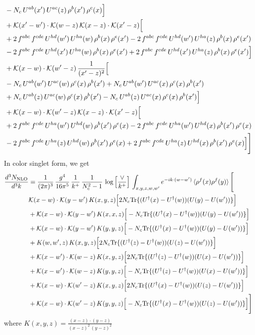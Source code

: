 \documentclass[9pt]{article}
\numberwithin{equation}{section}
\begin{document}
\begin{align}
& -N_{c}\,U^{ab}(x')\,U^{ac}(z)\,\rho^{b}(x')\,\rho^{c}(x)\Big]\notag\\
& +\mathcal{K}(x'-w')\cdot\mathcal{K}(w-z)\,\mathcal{K}(x-z)\cdot\mathcal{K}(x'-z)\Big[\notag\\
& +2\,f^{abc}\,f^{cde}\,U^{hd}(w')\,U^{ha}(w)\,\rho^{b}(x)\,\rho^{e}(x') -2\,f^{abc}\,f^{cde}\,U^{hd}(w')\,U^{ha}(z)\,\rho^{b}(x)\,\rho^{e}(x')\notag\\
& -2\,f^{abc}\,f^{cde}\,U^{hd}(x')\,U^{ha}(w)\,\rho^{b}(x)\,\rho^{e}(x') +2\,f^{abc}\,f^{cde}\,U^{hd}(x')\,U^{ha}(z)\,\rho^{b}(x)\,\rho^{e}(x')\Big]\notag\\
& +\mathcal{K}(x-w)\cdot\mathcal{K}(w'-z)\,\frac{1}{(x'-z)^{2}}\Big[\notag\\
& -N_{c}\,U^{ab}(w')\,U^{ac}(w)\,\rho^{c}(x)\,\rho^{b}(x') +N_{c}\,U^{ab}(w')\,U^{ac}(x)\,\rho^{c}(x)\,\rho^{b}(x')\notag\\
& +N_{c}\,U^{ab}(z)\,U^{ac}(w)\,\rho^{c}(x)\,\rho^{b}(x') -N_{c}\,U^{ab}(z)\,U^{ac}(x)\,\rho^{c}(x)\,\rho^{b}(x')\Big]\notag\\
& +\mathcal{K}(x-w)\cdot\mathcal{K}(w'-z)\,\mathcal{K}(x-z)\cdot\mathcal{K}(x'-z)\Big[\notag\\
& +2\,f^{abc}\,f^{cde}\,U^{ha}(w')\,U^{hd}(w)\,\rho^{b}(x')\,\rho^{e}(x) -2\,f^{abc}\,f^{cde}\,U^{ha}(w')\,U^{hd}(x)\,\rho^{b}(x')\,\rho^{e}(x)\notag\\
& -2\,f^{abc}\,f^{cde}\,U^{ha}(z)\,U^{hd}(w)\,\rho^{b}(x')\,\rho^{e}(x) +2\,f^{abc}\,f^{cde}\,U^{ha}(z)\,U^{hd}(x)\,\rho^{b}(x')\,\rho^{e}(x)\Big]\Bigg]
\end{align}
In color singlet form, we get
\begin{align}
\frac{d^{3}N_{\mathrm{NLO}}}{d^{3}k} & = \frac{1}{(2\pi)^{3}}\,\frac{g^{4}}{16\pi^{5}}\,\frac{1}{k^{+}}\,\frac{1}{N^{2}_{c}-1}\,\log\Big[\frac{\vee}{k^{+}}\Big]\,\int_{x,y,z,w,w'}e^{-ik\cdot (w-w')}\,\langle\rho^{f}(x)\rho^{f}(y) \rangle\,\Bigg[ \notag\\ & \mathcal K(x-w)\cdot\mathcal K(y-w')\,K(x,y,z)\Big[2 N_{c}{\rm Tr}\{(U^\dagger(x)-U^\dagger(w))(U(y)-U(w'))\}\Big]\notag\\
&+\mathcal K(x-w)\cdot\mathcal K(y-w')\,K(x,x,z)\Big[-N_{c}{\rm Tr}\{(U^\dagger(x)-U^\dagger(w))(U(y)-U(w'))\}\Big]\notag\\
&+\mathcal K(x-w)\cdot\mathcal K(y-w')\,K(y,y,z)\Big[-N_{c}{\rm Tr}\{(U^\dagger(x)-U^\dagger(w))(U(y)-U(w'))\}\Big]\notag\\
&+K(w,w',z)\,K(x,y,z)\Big[2 N_{c}{\rm Tr}\{(U^\dagger(z)-U^\dagger(w))(U(z)-U(w'))\}\Big]\notag\\
&+\mathcal K(x-w')\cdot\mathcal K(w-z)\,K(x,y,z)\Big[2 N_{c}{\rm Tr}\{(U^\dagger(z)-U^\dagger(w))(U(x)-U(w'))\}\Big]\notag\\
&+\mathcal K(x-w')\cdot\mathcal K(w-z)\,K(y,y,z)\Big[-N_{c}{\rm Tr}\{(U^\dagger(z)-U^\dagger(w))(U(x)-U(w'))\}\Big]\notag\\
&+\mathcal K(x-w)\cdot\mathcal K(w'-z)\,K(x,y,z)\Big[2 N_{c}{\rm Tr}\{(U^\dagger(x)-U^\dagger(w))(U(z)-U(w'))\}\Big]\notag\\
&+\mathcal K(x-w)\cdot\mathcal K(w'-z)\,K(y,y,z)\Big[-N_{c}{\rm Tr}\{(U^\dagger(x)-U^\dagger(w))(U(z)-U(w'))\}\Big]\Bigg]
\end{align}
where $K(x,y,z) = \frac{(x-z)\cdot (y-z)}{(x-z)^{2}\, (y-z)^{2}}$
\end{document}
